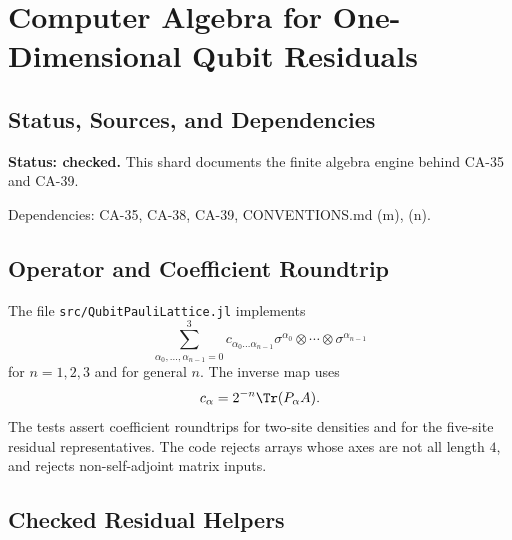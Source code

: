 
\section{Computer Algebra for One-Dimensional Qubit Residuals}
\label{sec:qubit-1d-residual-computer-algebra}

\subsection{Status, Sources, and Dependencies}

\textbf{Status: checked.}  This shard documents the finite algebra engine
behind CA-35 and CA-39.

Dependencies: CA-35, CA-38, CA-39, CONVENTIONS.md (m), (n).


\subsection{Operator and Coefficient Roundtrip}

The file \texttt{src/QubitPauliLattice.jl} implements
\[
  \sum_{\alpha_0,\ldots,\alpha_{n-1}=0}^3
  c_{\alpha_0\ldots\alpha_{n-1}}
  \sigma^{\alpha_0}\otimes\cdots\otimes\sigma^{\alpha_{n-1}}
\]
for \(n=1,2,3\) and for general \(n\).  The inverse map uses
\[
  c_\alpha=2^{-n}\Tr(P_\alpha A).
\]
The tests assert coefficient roundtrips for two-site densities and for the
five-site residual representatives.  The code rejects arrays whose axes are
not all length \(4\), and rejects non-self-adjoint matrix inputs.

\subsection{Checked Residual Helpers}

